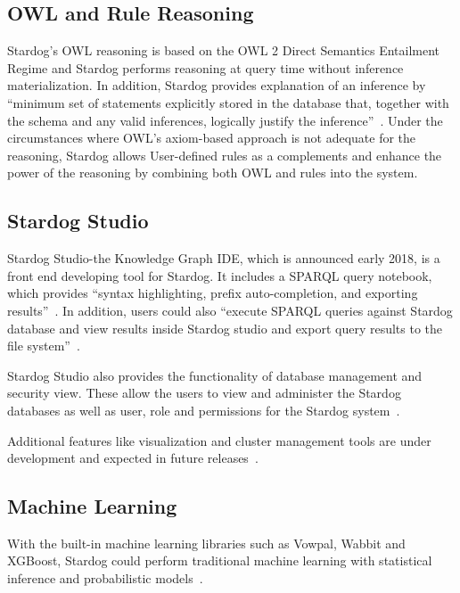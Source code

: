	\subsection{OWL and Rule Reasoning}
		Stardog’s OWL reasoning is based on the OWL 2 Direct Semantics 
		Entailment Regime and Stardog performs reasoning at query time 
		without inference materialization. In addition, Stardog provides 
		explanation of an inference by ``minimum set of statements explicitly 
		stored in the database that, together with the schema and any valid 
		inferences, logically justify the 
		inference''~\cite{hid-sp18-405-www-stardog-docs}. Under the 
		circumstances where OWL’s axiom-based approach is not adequate for 
		the reasoning, Stardog allows User-defined rules as a complements and 
		enhance the power of the reasoning by combining both OWL and rules 
		into the system. 

	\subsection{Stardog Studio}
		Stardog Studio-the Knowledge Graph IDE, which is announced early 
		2018, is a front end developing tool for Stardog. It includes a SPARQL 
		query notebook, which provides ``syntax highlighting, prefix 
		auto-completion, and exporting 
		results''~\cite{hid-sp18-405-blog-stardog-studio}. In addition, users 
		could also ``execute SPARQL queries against Stardog database and 
		view results inside Stardog studio and export query results to the file 
		system''~\cite{hid-sp18-405-www-stardog-studio}.
		
		Stardog Studio also provides the functionality of database management 
		and security view. These allow the users to view and administer the 
		Stardog databases as well as user, role and permissions for the Stardog 
		system~\cite{hid-sp18-405-blog-stardog-studio}.
		
		Additional features like visualization and cluster management tools are 
		under development and expected in future 
		releases~\cite{hid-sp18-405-www-stardog-studio}.

	\subsection{Machine Learning}
		With the built-in machine learning libraries such as Vowpal, Wabbit and 
		XGBoost, Stardog could perform traditional machine learning with 
		statistical	inference and probabilistic 
		models~\cite{hid-sp18-405-blog-stardog-xgboost}. 
		

